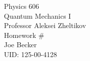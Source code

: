 \begin{titlepage}
\setlength{\topmargin}{1.5in}
\begin{center}
\Huge{Physics 606} \\
\LARGE{Quantum Mechanics I} \\
\Large{Professor Aleksei Zheltikov} \\[1cm]

\huge{Homework \#\HWnum}\\[0.5cm]

\large{Joe Becker} \\
\large{UID: 125-00-4128} \\
\large{\due} 

\end{center}

\end{titlepage}

